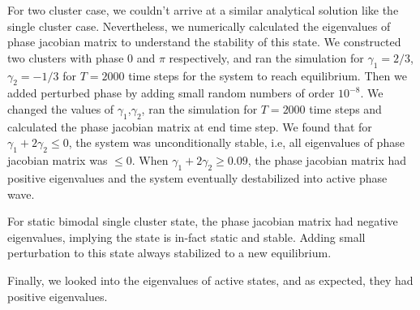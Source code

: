 \documentclass[superscriptaddress,reprint,amssymb, amsmath,aps, pre]{revtex4-1}
\begin{document}
{{        For two cluster case, we couldn't arrive at a similar analytical solution like the single cluster case. Nevertheless, we numerically calculated the eigenvalues of phase jacobian matrix to understand the stability of this state. We constructed two clusters with phase \(0\) and \(\pi\) respectively, and ran the simulation for \(\gamma_1 = 2/3\), \(\gamma_2 = -1/3\) for \(T = 2000\) time steps for the system to reach equilibrium. Then we added perturbed phase by adding small random numbers of order \(10^{-8}\). We changed the values of \(\gamma_1\),\(\gamma_2\), ran the simulation for \(T = 2000\) time steps and calculated the phase jacobian matrix at end time step. We found that for \(\gamma_1 + 2\gamma_2 \leq 0\), the system was unconditionally stable, i.e, all eigenvalues of phase jacobian matrix was \(\leq 0\). When \(\gamma_1 + 2\gamma_2 \geq 0.09\), the phase jacobian matrix had positive eigenvalues and the system eventually destabilized into active phase wave. 

        For static bimodal single cluster state, the phase jacobian matrix had negative eigenvalues, implying the state is in-fact static and stable. Adding small perturbation to this state always stabilized to a new equilibrium.  

        Finally, we looked into the eigenvalues of active states, and as expected, they had positive eigenvalues.
    }
}
\end{document}
